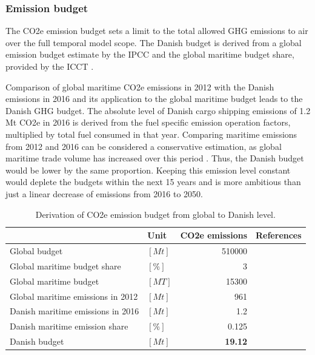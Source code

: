 \documentclass[article]{elsarticle}
\begin{document}
\subsubsection{Emission budget}
The CO2e emission budget sets a limit to the total allowed GHG emissions to air over the full temporal model scope. The Danish budget is derived from a global emission budget estimate by the IPCC \cite[Tab.~SPM.3, RCP2.6]{IPCC2013} and the global maritime budget share, provided by the ICCT \cite{Olmer2017}.

Comparison of global maritime CO2e emissions in 2012 with the Danish emissions in 2016 and its application to the global maritime budget leads to the Danish GHG budget. The absolute level of Danish cargo shipping emissions of 1.2 Mt CO2e in 2016 is derived from the fuel specific emission operation factors, multiplied by total fuel consumed in that year. Comparing maritime emissions from 2012 and 2016 can be considered a conservative estimation, as global maritime trade volume has increased over this period \cite[Tab.~1.3,~p.~5]{UNCTAD2017}. Thus, the Danish budget would be lower by the same proportion. Keeping this emission level constant would deplete the budgets within the next 15 years and is more ambitious than just a linear decrease of emissions from 2016 to 2050.
\begin{table}[htb]
    \centering
    \begin{tabular}{llrr}
        \toprule
         & Unit & CO2e emissions & References \\
         \midrule
         Global budget & $\left[Mt\right]$ & 510000 & \cite{IPCC2013} \\
         Global maritime budget share & $\left[\%\right]$ & 3 & \cite{Olmer2017} \\
         Global maritime budget & $\left[MT\right]$ & 15300 &\\[1.5ex]
         Global maritime emissions in 2012 & $\left[Mt\right]$ & 961 & \cite{Smith2014} \\
         Danish maritime emissions in 2016 & $\left[Mt\right]$ & 1.2 & \cite{Kristensen2012,Eurostat2018,Wisdom2017} \\
         Danish maritime emission share & $\left[\%\right]$ & 0.125 &\\[1.5ex]
         Danish budget & $\left[Mt\right]$ & \textbf{19.12} & \\
         \bottomrule
    \end{tabular}
    \caption[Danish CO2e emission budget]{Derivation of CO2e emission budget from global to Danish level.}
    \label{tab:dk_em_budget}
\end{table}
\end{document}

